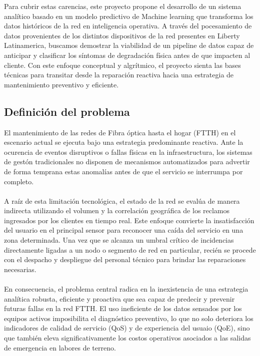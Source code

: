 \documentclass[12pt,a4paper]{article}
\begin{document}
    \noindent
    Para cubrir estas carencias, este proyecto propone el desarrollo de un sistema analítico basado en un modelo predictivo de Machine learning que transforma los datos históricos de la red en inteligencia operativa. A través del pocesamiento de datos provenientes
    de los distintos dispositivos de la red presentes en Liberty Latinamerica, buscamos demostrar la viabilidad de un pipeline de datos capaz de anticipar y clasificar los síntomas de degradación física antes de que impacten al cliente. Con este
    enfoque conceptual y algrítmico, el proyecto sienta las bases técnicas para transitar desde la reparación reactiva hacia una estrategia de mantenimiento preventivo y eficiente.

    \subsection{Definición del problema}
    \noindent
    El mantenimiento de las redes de Fibra óptica hasta el hogar (FTTH) en el escenario actual se ejecuta bajo una estrategia predominante reactiva. Ante la ocurencia de eventos disruptivos o fallas físicas en la infraestructura,
    los sistemas de gestón tradicionales no disponen de mecanismos automatizados para advertir de forma temprana estas anomalías antes de que el servicio se interrumpa por completo.\\\\


    \noindent
    A raíz de esta limitación tecnológica, el estado de la red se evalúa de manera indirecta utilizando el volumen y la correlación geográfica de los reclamos ingresados por los clientes en tiempo real. Este enfoque
    convierte la insatisfacción del usuario en el principal sensor para reconocer una caída del servicio en una zona determinada. Una vez que se alcanza un umbral crítico de incidencias directamente ligadas a un nodo
    o segmento de red en particular, recién se procede con el despacho y despliegue del personal técnico para brindar las reparaciones necesarias.\\\\
    
    \noindent
    En consecuencia, el problema central radica en la inexistencia de una estrategia analítica robusta, eficiente y proactiva que sea capaz de predecir y prevenir futuras fallas en la red FTTH. El uso ineficiente de los
    datos sensados por los equipos activos imposibilita el diagnóstico preventivo, lo que no solo deteriora los indicadores de calidad de servicio (QoS) y de experiencia del usuaio (QoE), sino que también eleva significativamente
    los costos operativos asociados a las salidas de emergencia en labores de terreno.
    
\end{document}
